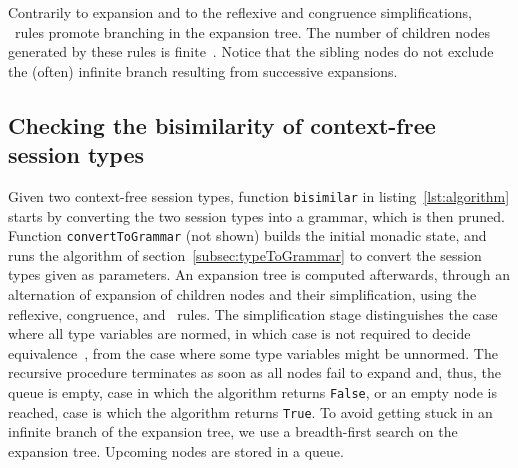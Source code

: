 Contrarily to expansion and to the reflexive and congruence
simplifications, \BPA\ rules promote branching in the expansion
tree. The number of children nodes generated by these rules is
finite~\cite{DBLP:journals/iandc/ChristensenHS95}.
%
Notice that the sibling nodes do not exclude the (often) infinite
branch resulting from successive expansions.

\subsection{Checking the bisimilarity of context-free session types}


Given two context-free session types, function \lstinline|bisimilar|
in listing~\ref{lst:algorithm} starts by converting the two session
types into a grammar, which is then pruned. Function
\lstinline|convertToGrammar| (not shown) builds the initial monadic
state, and runs the algorithm of section~\ref{subsec:typeToGrammar} to
convert the session types given as parameters.
%
An expansion tree is computed afterwards, through an alternation of
expansion of children nodes and their simplification, using the
reflexive, congruence, and \BPA\ rules. The simplification stage 
distinguishes the case where all type variables are normed,
in which case  is not required to decide 
equivalence~\cite{DBLP:journals/iandc/ChristensenHS95}, from the case
where some type variables might be unnormed. The recursive procedure
terminates as soon as all nodes fail to expand and, thus, the queue is
empty, case in which the algorithm returns \lstinline|False|, or an
empty node is reached, case is which the algorithm returns
\lstinline|True|.
%
To avoid getting stuck in an infinite branch of the expansion tree, we
use a breadth-first search on the expansion tree. Upcoming nodes are
stored in a queue.

